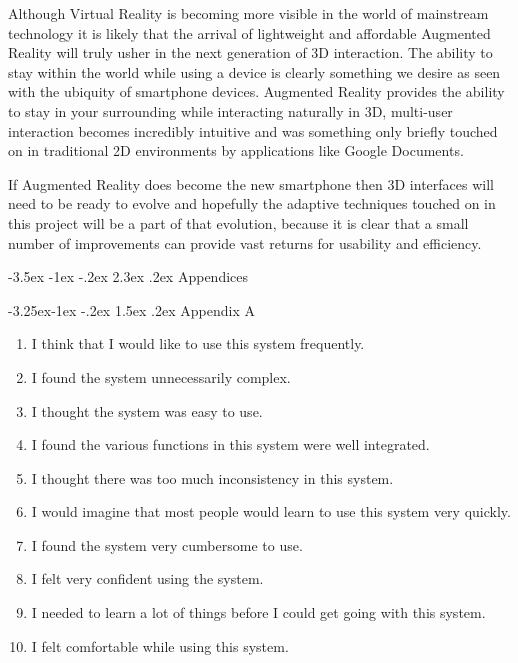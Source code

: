 \documentclass[12pt]{article}
\makeatletter
\renewcommand{\section}{\@startsection {section}{1}{\z@}%
             {-3.5ex \@plus -1ex \@minus -.2ex}%
             {2.3ex \@plus .2ex}%
             {\normalfont\Large\scshape\bfseries}}
\renewcommand{\subsection}{\@startsection{subsection}{2}{\z@}%
             {-3.25ex\@plus -1ex \@minus -.2ex}%
             {1.5ex \@plus .2ex}%
             {\normalfont\large\scshape\bfseries}}
\makeatother
\begin{document}
Although Virtual Reality is becoming more visible in the world of mainstream technology it is likely that the arrival of lightweight and affordable Augmented Reality will truly usher in the next generation of 3D interaction. The ability to stay within the world while using a device is clearly something we desire as seen with the ubiquity of smartphone devices. Augmented Reality provides the ability to stay in your surrounding while interacting naturally in 3D, multi-user interaction becomes incredibly intuitive and was something only briefly touched on in traditional 2D environments by applications like Google Documents.

If Augmented Reality does become the new smartphone then 3D interfaces will need to be ready to evolve and hopefully the adaptive techniques touched on in this project will be a part of that evolution, because it is clear that a small number of improvements can provide vast returns for usability and efficiency.

\pagebreak

\section{Appendices}

\subsection{Appendix A}

\begin{enumerate}
\item I think that I would like to use this system frequently.
\item I found the system unnecessarily complex. 
\item I thought the system was easy to use. 
\item I found the various functions in this system were well integrated. 
\item I thought there was too much inconsistency in this system. 
\item I would imagine that most people would learn to use this system very quickly. 
\item I found the system very cumbersome to use. 
\item I felt very confident using the system.
\item I needed to learn a lot of things before I could get going with this system. 
\item I felt comfortable while using this system.
\end{enumerate}
\end{document}
